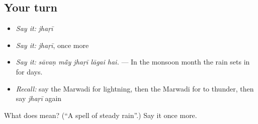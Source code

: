 \subsection*{Your turn}
\begin{itemize}
\raggedright
  \item \emph{Say it:} \emph{jhaṛī}
  \item \emph{Say it:} \emph{jhaṛī}, once more
  \item \emph{Say it:} \emph{sāvaṇ mā̃y jhaṛī lāgai hai.} — In the monsoon month the rain sets in for days.
  \item \emph{Recall:} say the Marwadi for lightning, then the Marwadi for to thunder, then say \emph{jhaṛī} again
\end{itemize}

\begin{tcolorbox}[breakable,colback=teal!4,colframe=teal!35!black,title={Before you move on}]
What does  mean? (\textquotedblleft{}A spell of steady rain\textquotedblright{}.) Say it once more.
\end{tcolorbox}
